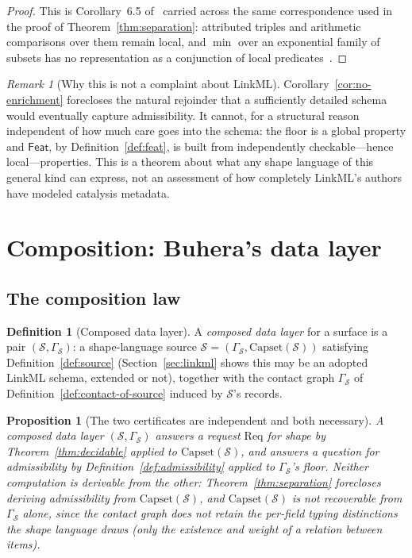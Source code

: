 \documentclass[11pt,a4paper,twocolumn]{article}
\newtheorem{proposition}[theorem]{Proposition}
\theoremstyle{definition}
\newtheorem{definition}[theorem]{Definition}
\theoremstyle{remark}
\newtheorem{remark}[theorem]{Remark}
\newcommand{\Feat}{\mathsf{Feat}}
\newcommand{\Capset}{\mathrm{Capset}}
\newcommand{\Src}{\mathcal{S}}
\newcommand{\Gph}{\Gamma}
\newcommand{\Req}{\mathrm{Req}}
\begin{document}
\begin{proof}
This is Corollary~6.5 of~\cite{ladder} carried across the same correspondence
used in the proof of Theorem~\ref{thm:separation}: attributed triples and
arithmetic comparisons over them remain local, and $\min$ over an exponential
family of subsets has no representation as a conjunction of local
predicates~\cite{ladder}.
\end{proof}

\begin{remark}[Why this is not a complaint about LinkML]
Corollary~\ref{cor:no-enrichment} forecloses the natural rejoinder that a
sufficiently detailed schema would eventually capture admissibility. It cannot,
for a structural reason independent of how much care goes into the schema: the
floor is a global property and $\Feat$, by Definition~\ref{def:feat}, is built
from independently checkable---hence local---properties. This is a theorem about
what any shape language of this general kind can express, not an assessment of
how completely LinkML's authors have modeled catalysis metadata.
\end{remark}

\section{Composition: Buhera's data layer}
\label{sec:composition}

\subsection{The composition law}

\begin{definition}[Composed data layer]
\label{def:composed}
A \emph{composed data layer} for a surface is a pair $(\Src, \Gph_\Src)$: a
shape-language source $\Src=(\Gamma_\Src,\Capset(\Src))$ satisfying
Definition~\ref{def:source} (Section~\ref{sec:linkml} shows this may be an
adopted LinkML schema, extended or not), together with the contact graph
$\Gph_\Src$ of Definition~\ref{def:contact-of-source} induced by $\Src$'s
records.
\end{definition}

\begin{proposition}[The two certificates are independent and both necessary]
\label{prop:both-necessary}
A composed data layer $(\Src,\Gph_\Src)$ answers a request $\Req$ for shape by
Theorem~\ref{thm:decidable} applied to $\Capset(\Src)$, and answers a question
for admissibility by Definition~\ref{def:admissibility} applied to $\Gph_\Src$'s
floor. Neither computation is derivable from the other: Theorem~\ref{thm:separation}
forecloses deriving admissibility from $\Capset(\Src)$, and $\Capset(\Src)$ is
not recoverable from $\Gph_\Src$ alone, since the contact graph does not
retain the per-field typing distinctions the shape language draws (only the
existence and weight of a relation between items).
\end{proposition}
\end{document}
